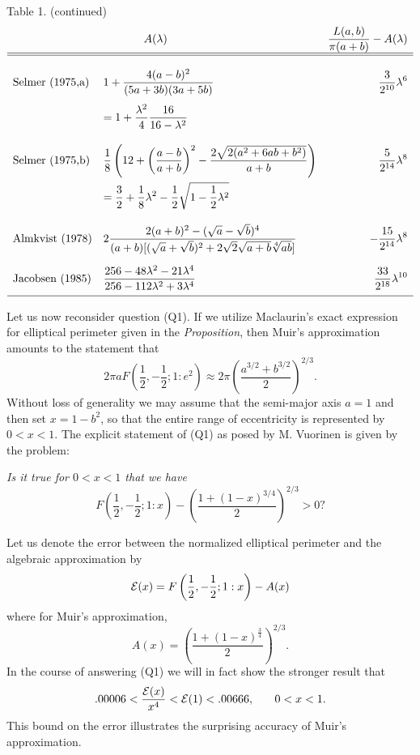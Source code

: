 \documentclass[12pt]{article}
\begin{document}
\noindent Table 1. (continued)
$$
\begin{array}{llr}
 & \hspace{.5in} A(\lambda) &  \displaystyle{\frac{L(a,b)}{ \pi
(a+b)} - A(\lambda)}\\
  \hline  \hline \\
 \mbox{Selmer  (1975,a)} &
\displaystyle{1+\frac{4(a-b)^2}{(5a+3b)(3a+5b)}} & 
\displaystyle{\frac{3}{2^{10}}\lambda^{6}}
\\ [3ex] &
\displaystyle{=1 + \frac{\lambda^2}{4}\frac{16}{16-\lambda^2}}  &
\\ [4ex]  
 \mbox{Selmer  (1975,b)} & 
\displaystyle{\frac{1}{8}\left(12+\left(\frac{a-b}{a+b}
\right)^2-\frac{2\sqrt{2(a^2+6ab+b^2)}}{a+b}\right)}  & 
\displaystyle{\frac{5}{2^{14}} \lambda^{8}}
\\  [3ex]
& \displaystyle =\frac{3}{2} + \frac{1}{8}
\lambda^2-\frac{1}{2}\sqrt{1-\frac{1}{2}\lambda^2} &
\\  [4ex]
\mbox{Almkvist (1978)} &
\displaystyle{2\frac{2(a+b)^2-(\sqrt{a}-\sqrt{b})^4}{(a+b)[(\sqrt{a}+\sqrt{
b})^2 +
2\sqrt{2}\sqrt{a+b}\sqrt[4]{ab}]}} & 
\displaystyle{ -\frac{15}{2^{14}}\lambda^{8}}
\\ [4ex]  
\mbox{Jacobsen (1985)} &
\displaystyle{ 
\frac{256-48\lambda^2-21\lambda^4}{256-112\lambda^2+3\lambda^4}} & 
\displaystyle{\frac{33}{2^{18}}\lambda^{10}} 
\\ [2ex] \hline
\end{array}
$$

\normalsize

\vspace{12pt}
Let us now reconsider question (Q1). If we utilize Maclaurin's exact 
expression for elliptical perimeter given
in  the {\em Proposition},  then  Muir's approximation  amounts to the 
statement that 
$$  
2\pi a F\left(\frac{1}{2}, -\frac{1}{2}; 1: e^2\right) \approx 2\pi
\left(\frac{a^{3/2}+b^{3/2}}{2} \right)^{2/3}.
$$
Without loss of generality  we may assume that the semi-major axis $a=1$ and 
then set
$x=1-b^2$, so that the entire range of eccentricity is represented by $0< 
x<1$.  The explicit
statement of (Q1) as  posed by M. Vuorinen  is given by the problem: 

\vspace{6pt}
{\em Is it true for  $0<x<1$ that we have}
$$
 F\left(\frac{1}{2}, -\frac{1}{2};1:x \right) - 
\left(\frac{1+(1-x)^{3/4}}{2}
\right)^{2/3} >0?
$$

Let us  denote the error between the normalized elliptical perimeter and the 
algebraic approximation  by
\begin{equation} {\cal E}(x)= F\left(\frac{1}{2},-\frac{1}{2};1:x\right) 
- A(x)
\end{equation} 
where for Muir's approximation, 
$$
 A(x)=\left(\frac{1+(1-x)^{\frac{3}{4}}}{2}  \right)^{2/3}.
$$ 
In the course of answering  (Q1) we will in fact show the stronger result 
that
\begin{equation} .00006 < \frac{{\cal E}(x)}{x^4} < {\cal E}(1) <  
.00666, \hspace{.25in}  0< x
< 1.
\end{equation}
This bound on the error illustrates the surprising  accuracy of Muir's 
approximation.
\end{document}
